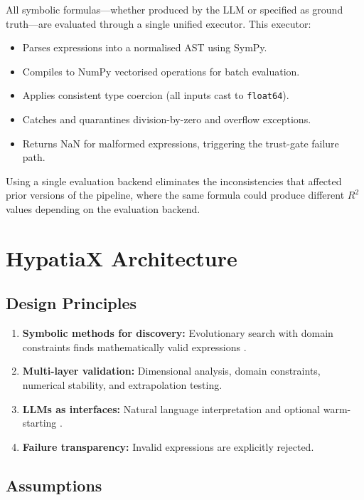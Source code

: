 \documentclass[twoside,11pt]{article}
\newcommand{\Rsq}{R^{2}}
\begin{document}
All symbolic formulas---whether produced by the LLM or specified as ground truth---are
evaluated through a single unified executor.  This executor:
\begin{itemize}
  \item Parses expressions into a normalised AST using SymPy.
  \item Compiles to NumPy vectorised operations for batch evaluation.
  \item Applies consistent type coercion (all inputs cast to \texttt{float64}).
  \item Catches and quarantines division-by-zero and overflow exceptions.
  \item Returns NaN for malformed expressions, triggering the trust-gate failure path.
\end{itemize}
Using a single evaluation backend eliminates the inconsistencies that affected
prior versions of the pipeline, where the same formula could produce different
$\Rsq$ values depending on the evaluation backend.

\section{HypatiaX Architecture}
\label{sec:architecture}

\subsection{Design Principles}\label{subsec:design-principles}
\label{sec:arch_principles}

\begin{enumerate}
\item \textbf{Symbolic methods for discovery:} Evolutionary search with domain
  constraints finds mathematically valid expressions \citep{cranmer2023pysr}.
\item \textbf{Multi-layer validation:} Dimensional analysis, domain constraints,
  numerical stability, and extrapolation testing.
\item \textbf{LLMs as interfaces:} Natural language interpretation and optional
  warm-starting \citep{kambhampati2024llms}.
\item \textbf{Failure transparency:} Invalid expressions are explicitly rejected.
\end{enumerate}

\subsection{Assumptions}\label{subsec:assumptions}
\label{sec:assumptions}
\end{document}
